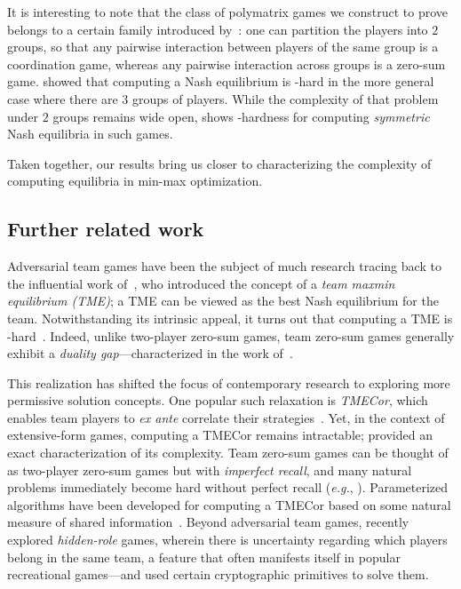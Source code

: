 It is interesting to note that the class of polymatrix games we construct to prove~ belongs to a certain family introduced by~\citet{Cai11:Minmax}: one can partition the players into $2$ groups, so that any pairwise interaction between players of the same group is a coordination game, whereas any pairwise interaction across groups is a zero-sum game. \citet{Cai11:Minmax} showed that computing a Nash equilibrium is \PPAD-hard in the more general case where there are $3$ groups of players. While the complexity of that problem under $2$ groups remains wide open,  shows \PPAD-hardness for computing \emph{symmetric} Nash equilibria in such games.

Taken together, our results bring us closer to characterizing the complexity of computing equilibria in min-max optimization.

\subsection{Further related work}

Adversarial team games have been the subject of much research tracing back to the influential work of~\citet{Stengel97:Team}, who introduced the concept of a \emph{team maxmin equilibrium (TME)}; a TME can be viewed as the best Nash equilibrium for the team. Notwithstanding its intrinsic appeal, it turns out that computing a TME is \FNP-hard~\citep{Borgs10:The}. Indeed, unlike two-player zero-sum games, team zero-sum games generally exhibit a \emph{duality gap}---characterized in the work of~\citet{schulman2017duality}.

This realization has shifted the focus of contemporary research to exploring more permissive solution concepts. One popular such relaxation is \emph{TMECor}, which enables team players to \emph{ex ante} correlate their strategies~\citep{Zhang23:Team,Zhang21:Computing,Basilico17:Team,Carminati22:A,Farina18:Ex,Zhang20:Converging,Celli18:Computational}. Yet, in the context of extensive-form games, computing a TMECor remains intractable; \citet{Zhang23:Team} provided an exact characterization of its complexity. Team zero-sum games can be thought of as two-player zero-sum games but with \emph{imperfect recall}, and many natural problems immediately become hard without perfect recall (\emph{e.g.}, \citet{Tewolde23:Computational}). Parameterized algorithms have been developed for computing a TMECor based on some natural measure of shared information~\citep{Zhang23:Team,Carminati22:A}. Beyond adversarial team games, \citet{Carminati23:Hidden} recently explored \emph{hidden-role} games, wherein there is uncertainty regarding which players belong in the same team, a feature that often manifests itself in popular recreational games---and used certain cryptographic primitives to solve them.

